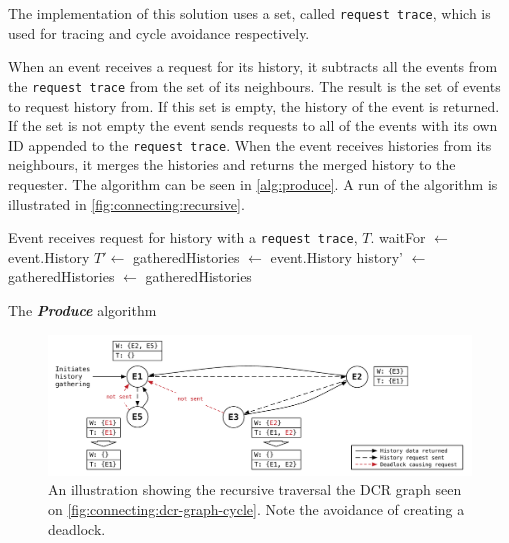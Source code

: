 	\newpar The implementation of this solution uses a set, called \texttt{request trace}, which is used for tracing and cycle avoidance respectively.
	
	When an event receives a request for its history, it subtracts all the events from the \texttt{request trace} from the set of its neighbours. The result is the set of events to request history from. If this set is empty, the history of the event is returned. If the set is not empty the event sends requests to all of the events with its own ID appended to the \texttt{request trace}. When the event receives histories from its neighbours, it merges the histories and returns the merged history to the requester. The algorithm can be seen in \autoref{alg:produce}. A run of the algorithm is illustrated in \autoref{fig:connecting:recursive}.
	
	\begin{algorithm}
		\begin{algorithmic}
			\State Event receives request for history with a \texttt{request trace}, $T$.
			\State
				\State waitFor $\gets$ 
					\Return event.History
				\Else
					\State $T'\gets$
					\State
					\State gatheredHistories $\leftarrow$ event.History
						\State history' $\leftarrow$ 
						\State gatheredHistories $\leftarrow$ 
					\EndFor
					\State\Return gatheredHistories
				\EndIf
			\EndFunction
		\end{algorithmic}
		\caption{The \textit{\textbf{Produce}} algorithm}
		\label{alg:produce}
	\end{algorithm}
	
	\begin{figure}[H]
		\centering
		\includegraphics[width=\textwidth]{4connect/images/recursive.pdf}
		\caption{An illustration showing the recursive traversal the DCR graph seen on \autoref{fig:connecting:dcr-graph-cycle}. Note the avoidance of creating a deadlock.}
		\label{fig:connecting:dcr-graph-cycle}
	\end{figure}
	
